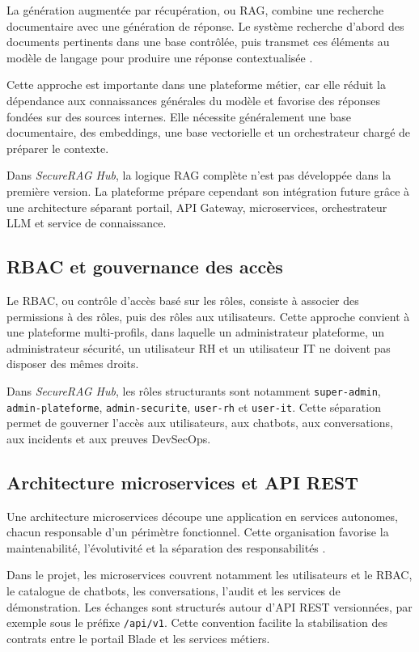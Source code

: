 La génération augmentée par récupération, ou RAG, combine une recherche documentaire avec une génération de réponse. Le système recherche d'abord des documents pertinents dans une base contrôlée, puis transmet ces éléments au modèle de langage pour produire une réponse contextualisée \cite{lewis_rag_2020}.

Cette approche est importante dans une plateforme métier, car elle réduit la dépendance aux connaissances générales du modèle et favorise des réponses fondées sur des sources internes. Elle nécessite généralement une base documentaire, des embeddings, une base vectorielle et un orchestrateur chargé de préparer le contexte.

Dans \textit{SecureRAG Hub}, la logique RAG complète n'est pas développée dans la première version. La plateforme prépare cependant son intégration future grâce à une architecture séparant portail, API Gateway, microservices, orchestrateur LLM et service de connaissance.

\subsection{RBAC et gouvernance des accès}

Le RBAC, ou contrôle d'accès basé sur les rôles, consiste à associer des permissions à des rôles, puis des rôles aux utilisateurs. Cette approche convient à une plateforme multi-profils, dans laquelle un administrateur plateforme, un administrateur sécurité, un utilisateur RH et un utilisateur IT ne doivent pas disposer des mêmes droits.

Dans \textit{SecureRAG Hub}, les rôles structurants sont notamment \texttt{super-admin}, \texttt{admin-plateforme}, \texttt{admin-securite}, \texttt{user-rh} et \texttt{user-it}. Cette séparation permet de gouverner l'accès aux utilisateurs, aux chatbots, aux conversations, aux incidents et aux preuves DevSecOps.

\subsection{Architecture microservices et API REST}

Une architecture microservices découpe une application en services autonomes, chacun responsable d'un périmètre fonctionnel. Cette organisation favorise la maintenabilité, l'évolutivité et la séparation des responsabilités \cite{newman_microservices}.

Dans le projet, les microservices couvrent notamment les utilisateurs et le RBAC, le catalogue de chatbots, les conversations, l'audit et les services de démonstration. Les échanges sont structurés autour d'API REST versionnées, par exemple sous le préfixe \texttt{/api/v1}. Cette convention facilite la stabilisation des contrats entre le portail Blade et les services métiers.


